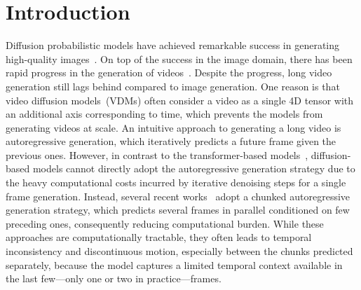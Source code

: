 \section{Introduction}
\label{sec:introduction}
Diffusion probabilistic models have achieved remarkable success in generating high-quality images~\citep{ho2020denoising,song2021scorebased,dhariwal2021diffusion,rombach2022high}.
On top of the success in the image domain, there has been rapid progress in the generation of videos~\citep{ho2022video,singer2022make,zhou2022magic,wang2023modelscope}.
%
Despite the progress, long video generation still lags behind compared to image generation.
One reason is that video diffusion models~(VDMs) often consider a video as a single 4D tensor with an additional axis corresponding to time, which prevents the models from generating videos at scale.
An intuitive approach to generating a long video is autoregressive generation, which iteratively predicts a future frame given the previous ones.
However, in contrast to the transformer-based models~\citep{hong2023cogvideo,villegas2023phenaki}, diffusion-based models cannot directly adopt the autoregressive generation strategy due to the heavy computational costs incurred by iterative denoising steps for a single frame generation.
Instead, several recent works~\citep{ho2022video,he2022latent,voleti2022mcvd,luo2023videofusion,chen2023seine,blattmann2023align} adopt a chunked autoregressive generation strategy, which predicts several frames in parallel conditioned on few preceding ones, consequently reducing computational burden.
While these approaches are computationally tractable, they often leads to temporal inconsistency and discontinuous motion, especially between the chunks predicted separately, because the model captures a limited temporal context available in the last few---only one or two in practice---frames.

